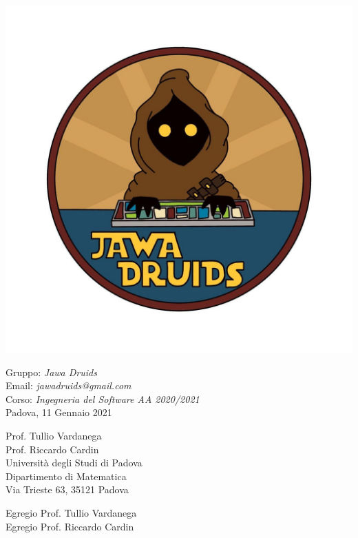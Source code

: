 \documentclass[a4paper,12pt]{report}
\begin{document}
\mbox{}
\vspace{-4cm}
\begin{center}
  \includegraphics[width=0.6\linewidth]{immagini/DRUIDSLOGO.jpg}
\end{center}
Gruppo: \textit{Jawa Druids} \\ Email: \textit{jawadruids@gmail.com}\\ Corso: \textit{Ingegneria del Software AA 2020/2021}\\Padova, 11 Gennaio 2021 \\
\begin{flushright}
  Prof. Tullio Vardanega \\
  Prof. Riccardo Cardin \\
  Università degli Studi di Padova \\
  Dipartimento di Matematica \\
  Via Trieste 63, 35121 Padova \\
\end{flushright}
Egregio Prof. Tullio Vardanega \\
Egregio Prof. Riccardo Cardin \\
\vspace{0.2cm}
\end{document}
